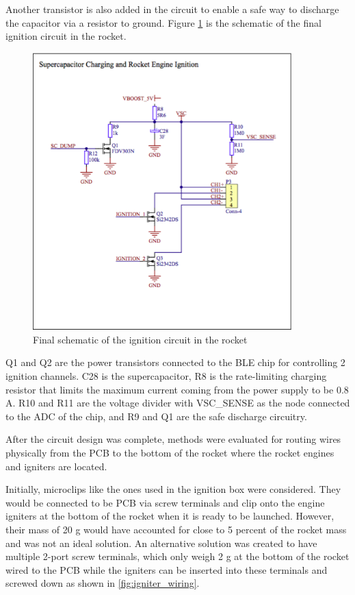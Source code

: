 \documentclass{workreport}
\begin{document}
\begin{body}
	Another transistor is also added in the circuit to enable a safe way to discharge the capacitor via a resistor to ground. Figure \ref{fig:final_ign} is the schematic of the final ignition circuit in the rocket.

	\begin{figure}[!ht]
		\centering
		\includegraphics[width=10cm]{./images/final_ign.png}
		\caption{Final schematic of the ignition circuit in the rocket}
		\label{fig:final_ign}
	\end{figure}

	Q1 and Q2 are the power transistors connected to the BLE chip for controlling 2 ignition channels. C28 is the supercapacitor, R8 is the rate-limiting charging resistor that limits the maximum current coming from the power supply to be 0.8 A. R10 and R11 are the voltage divider with VSC_SENSE as the node connected to the ADC of the chip, and R9 and Q1 are the safe discharge circuitry.

	After the circuit design was complete, methods were evaluated for routing wires physically from the PCB to the bottom of the rocket where the rocket engines and igniters are located.

	Initially, microclips like the ones used in the ignition box were considered. They would be connected to be PCB via screw terminals and clip onto the engine igniters at the bottom of the rocket when it is ready to be launched. However, their mass of 20 g would have accounted for close to 5 percent of the rocket mass and was not an ideal solution. An alternative solution was created to have multiple 2-port screw terminals, which only weigh 2 g at the bottom of the rocket wired to the PCB while the igniters can be inserted into these terminals and screwed down as shown in \ref{fig:igniter_wiring}.


\end{body}
\end{document}
